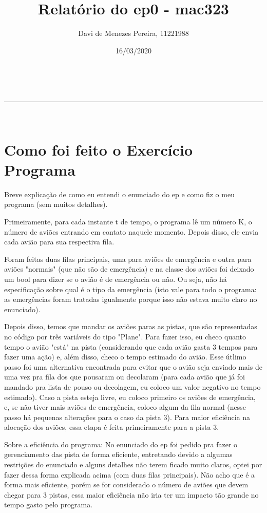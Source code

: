 \documentclass[a4paper,11pt]{article}
\makeatletter
\newcommand{\linia}{\rule{\linewidth}{0.5pt}}
\theoremstyle{mytheor}
\renewcommand{\maketitle}{
\begin{center}
\vspace{2ex}
{\huge \textsc{\@title}}
\vspace{1ex}
\\
\linia\\
\@author \hfill \@date
\vspace{4ex}
\end{center}
}
\makeatother
\begin{document}
\title{Relatório do ep0 - mac323}

\author{Davi de Menezes Pereira, 11221988}

\date{16/03/2020}

\maketitle

\section*{Como foi feito o Exercício Programa}

Breve explicação de como eu entendi o enunciado do ep e como fiz o meu programa (sem muitos detalhes). \newline

Primeiramente, para cada instante t de tempo, o programa lê um número K, o número de aviões entrando em contato naquele momento. Depois disso, ele envia cada avião para sua respectiva fila.\newline

Foram feitas duas filas principais, uma para aviões de emergência e outra para aviões "normais" (que não são de emergência) e na classe dos aviões foi deixado um bool para dizer se o avião é de emergência ou não. Ou seja, não há especificação sobre qual é o tipo da emergência (isto vale para todo o programa: as emergências foram tratadas igualmente porque isso não estava muito claro no enunciado).\newline

Depois disso, temos que mandar os aviões paras as pistas, que são representadas no código por três variáveis do tipo "Plane". 
Para fazer isso, eu checo quanto tempo o avião "está" na pista (considerando que cada avião gasta 3 tempos para fazer uma ação) e, além disso, checo o tempo estimado do avião.
Esse útlimo passo foi uma alternativa encontrada para evitar que o avião seja enviado mais de uma vez pra fila dos que pousaram ou decolaram (para cada avião que já foi mandado pra lista de pouso ou decolagem, eu coloco um valor negativo no tempo estimado). Caso a pista esteja livre, eu coloco primeiro os aviões de emergência, e, se não tiver mais aviões de emergência, coloco algum da fila normal (nesse passo há pequenas alterações para o caso da pista 3). Para maior eficiência na alocação dos aviões, essa etapa é feita primeiramente para a pista 3.\newline

Sobre a eficiência do programa: No enunciado do ep foi pedido pra fazer o gerenciamento das pista de forma eficiente, entretando devido a algumas restrições do enunciado e alguns detalhes não terem ficado muito claros, optei por fazer dessa forma explicada acima (com duas filas principais). Não acho que é a forma mais eficiente, porém se for considerado o número de aviões que devem chegar para 3 pistas, essa maior eficiência não iria ter um impacto tão grande no tempo gasto pelo programa. \newline
\end{document}
